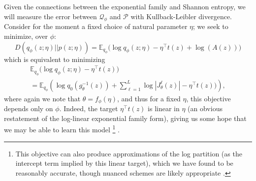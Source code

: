 \documentclass{article}
\begin{document}
Given the connections between the exponential family and Shannon entropy, we will measure the error between $\mathcal{Q}_{\phi}$ and $\mathcal{P}$ with Kullback-Leibler divergence.  Consider for the moment a fixed choice of natural parameter $\eta$; we seek to minimize, over $\phi$:
{\small 
\begin{equation} D\left( q_\phi(z;\eta) || p(z;\eta) \right) = \mathbb{E}_{q_\phi} \Bigg( \log q_\phi(z;\eta) - \eta^\top t(z) + \log(A(z)) \Bigg) 
\label{eq:5}
\end{equation}}
which is equivalent to minimizing
{\small 
\begin{multline}  
\mathbb{E}_{q_\phi} \Bigg( \log q_\phi(z;\eta) - \eta^\top t(z) \Bigg) \\ = \mathbb{E}_{q_\phi} \left( \log q_0\left( g_\theta^{-1}(z)\right) + \sum_{\ell=1}^L  \log | J^\ell_\theta(z) | - \eta^\top t(z)) \right),
\label{eq:51}
\end{multline}}
where again we note that $\theta = f_\phi(\eta)$, and thus for a fixed $\eta$, this objective depends only on $\phi$.  Indeed, the target $\eta^\top t(z)$ is linear in $\eta$ (an obvious restatement of the log-linear exponential family form), giving us some hope that we may be able to learn this model \footnote{This objective can also produce approximations of the log partition (as the intercept term implied by this linear target), which we have found to be reasonably accurate, though nuanced schemes are likely appropriate \citep{papamakarios2015distilling}.} .
\end{document}
